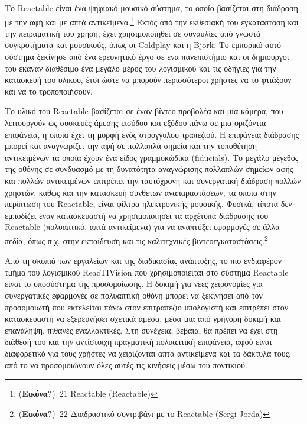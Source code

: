 \documentclass[
]{article}
\begin{document}
Το Reactable είναι ένα ψηφιακό μουσικό σύστημα, το οποίο βασίζεται στη
διάδραση με την αφή και με απτά αντικείμενα.\footnote{(\textbf{Εικόνα?})~21
  Reactable (Reactable)} Εκτός από την εκθεσιακή του εγκατάσταση και την
πειραματική του χρήση, έχει χρησιμοποιηθεί σε συναυλίες από γνωστά
συγκροτήματα και μουσικούς, όπως οι Coldplay και η Bjork. Το εμπορικό
αυτό σύστημα ξεκίνησε από ένα ερευνητικό έργο σε ένα πανεπιστήμιο και οι
δημιουργοί του έκαναν διαθέσιμο ένα μεγάλο μέρος του λογισμικού και τις
οδηγίες για την κατασκευή του υλικού, έτσι ώστε να μπορούν περισσότεροι
χρήστες να το φτιάξουν και να το τροποποιήσουν.

Το υλικό του Reactable βασίζεται σε έναν βίντεο-προβολέα και μία κάμερα,
που λειτουργούν ως συσκευές άμεσης εισόδου και εξόδου πάνω σε μια
οριζόντια επιφάνεια, η οποία έχει τη μορφή ενός στρογγυλού τραπεζιού. Η
επιφάνεια διάδρασης μπορεί και αναγνωρίζει την αφή σε πολλαπλά σημεία
και την τοποθέτηση αντικειμένων τα οποία έχουν ένα είδος γραμμοκώδικα
(fiducials). Το μεγάλο μέγεθος της οθόνης σε συνδυασμό με τη δυνατότητα
αναγνώρισης πολλαπλών σημείων αφής και πολλών αντικειμένων επιτρέπει την
ταυτόχρονη και συνεργατική διάδραση πολλών χρηστών, καθώς και την
κατασκευή σύνθετων αναπαραστάσεων, τα οποία στην περίπτωση του
Reactable, είναι φίλτρα ηλεκτρονικής μουσικής. Φυσικά, τίποτα δεν
εμποδίζει έναν κατασκευαστή να χρησιμοποιήσει τα αρχέτυπα διάδρασης του
Reactable (πολυαπτικό, απτά αντικείμενα) για να αναπτύξει εφαρμογές σε
άλλα πεδία, όπως π.χ. στην εκπαίδευση και τις καλιτεχνικές
βιντεοεγκαταστάσεις.\footnote{(\textbf{Εικόνα?})~22 Διαδραστικό
  συντριβάνι με το Reactable (Sergi Jorda)}

Από τη σκοπιά των εργαλείων και της διαδικασίας ανάπτυξης, το πιο
ενδιαφέρον τμήμα του λογισμικού ReacTIVision που χρησιμοποιείται στο
σύστημα Reactable είναι το υποσύστημα της προσομοίωσης. Η δοκιμή για
νέες χειρονομίες για συνεργατικές εφαρμογές σε πολυαπτική οθόνη μπορεί
να ξεκινήσει από τον προσομοιωτή που εκτελείται πάνω στον επιτραπέζιο
υπολογιστή και επιτρέπει στον κατασκευαστή να εξερευνήσει σχετικά άμεσα,
μέσα μια από γρήγορη δοκιμή και επανάληψη, πιθανές εναλλακτικές. Στη
συνέχεια, βέβαια, θα πρέπει να έχει στη διάθεσή του και την αντίστοιχη
πραγματική πολυαπτική επιφάνεια, αφού είναι διαφορετικό για τους χρήστες
να χειρίζονται απτά αντικείμενα και τα δάκτυλά τους, από το να
προσομοιώνουν όλες αυτές τις κινήσεις μέσω του ποντικιού.
\end{document}
